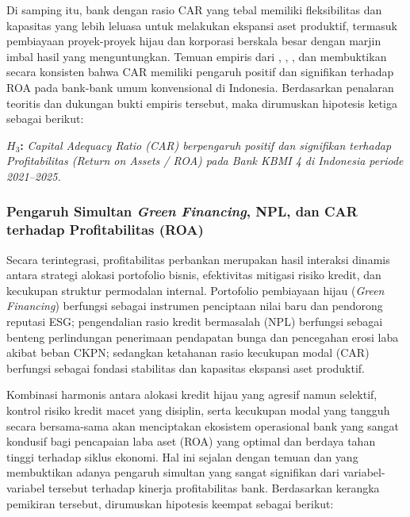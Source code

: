\documentclass[12pt,a4paper]{article}
\numberwithin{equation}{section}
\begin{document}
\noindent
Di samping itu, bank dengan rasio CAR yang tebal memiliki fleksibilitas dan kapasitas yang lebih leluasa untuk melakukan ekspansi aset produktif, termasuk pembiayaan proyek-proyek hijau dan korporasi berskala besar dengan marjin imbal hasil yang menguntungkan. Temuan empiris dari \citet{LestariPurnomo2023}, \citet{NugrohoUtami2021}, \citet{Pramono2022}, dan \citet{HaryantoSudarno2023} membuktikan secara konsisten bahwa CAR memiliki pengaruh positif dan signifikan terhadap ROA pada bank-bank umum konvensional di Indonesia. Berdasarkan penalaran teoritis dan dukungan bukti empiris tersebut, maka dirumuskan hipotesis ketiga sebagai berikut:

\vspace{0.2cm}
\noindent \textbf{$H_3$:} \emph{Capital Adequacy Ratio (CAR) berpengaruh positif dan signifikan terhadap Profitabilitas (Return on Assets / ROA) pada Bank KBMI 4 di Indonesia periode 2021--2025.}

\subsubsection{Pengaruh Simultan \emph{Green Financing}, NPL, dan CAR terhadap Profitabilitas (ROA)}
\noindent
Secara terintegrasi, profitabilitas perbankan merupakan hasil interaksi dinamis antara strategi alokasi portofolio bisnis, efektivitas mitigasi risiko kredit, dan kecukupan struktur permodalan internal. Portofolio pembiayaan hijau (\emph{Green Financing}) berfungsi sebagai instrumen penciptaan nilai baru dan pendorong reputasi ESG; pengendalian rasio kredit bermasalah (NPL) berfungsi sebagai benteng perlindungan penerimaan pendapatan bunga dan pencegahan erosi laba akibat beban CKPN; sedangkan ketahanan rasio kecukupan modal (CAR) berfungsi sebagai fondasi stabilitas dan kapasitas ekspansi aset produktif.

\noindent
Kombinasi harmonis antara alokasi kredit hijau yang agresif namun selektif, kontrol risiko kredit macet yang disiplin, serta kecukupan modal yang tangguh secara bersama-sama akan menciptakan ekosistem operasional bank yang sangat kondusif bagi pencapaian laba aset (ROA) yang optimal dan berdaya tahan tinggi terhadap siklus ekonomi. Hal ini sejalan dengan temuan \citet{Pramono2022} dan \citet{WulandariRahardjo2022} yang membuktikan adanya pengaruh simultan yang sangat signifikan dari variabel-variabel tersebut terhadap kinerja profitabilitas bank. Berdasarkan kerangka pemikiran tersebut, dirumuskan hipotesis keempat sebagai berikut:
\end{document}
